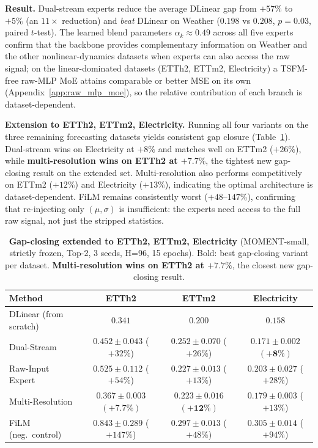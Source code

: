 \documentclass{article}
\begin{document}
\textbf{Result.} Dual-stream experts reduce the average DLinear gap from $+57\%$ to $+5\%$ (an $11\times$ reduction) and \emph{beat} DLinear on Weather ($0.198$ vs $0.208$, $p{=}0.03$, paired $t$-test). The learned blend parameters $\alpha_k \approx 0.49$ across all five experts confirm that the backbone provides complementary information on Weather and the other nonlinear-dynamics datasets when experts can also access the raw signal; on the linear-dominated datasets (ETTh2, ETTm2, Electricity) a TSFM-free raw-MLP MoE attains comparable or better MSE on its own (Appendix~\ref{app:raw_mlp_moe}), so the relative contribution of each branch is dataset-dependent.

\textbf{Extension to ETTh2, ETTm2, Electricity.} Running all four variants on the three remaining forecasting datasets yields consistent gap closure (Table~\ref{tab:gap_closing_ext}). Dual-stream wins on Electricity at $+8\%$ and matches well on ETTm2 ($+26\%$), while \textbf{multi-resolution wins on ETTh2 at $+7.7\%$}, the tightest new gap-closing result on the extended set. Multi-resolution also performs competitively on ETTm2 ($+12\%$) and Electricity ($+13\%$), indicating the optimal architecture is dataset-dependent. FiLM remains consistently worst ($+48$--$147\%$), confirming that re-injecting only $(\mu,\sigma)$ is insufficient: the experts need access to the full raw signal, not just the stripped statistics.

\begin{table}[!htbp]
\centering
\caption{\textbf{Gap-closing extended to ETTh2, ETTm2, Electricity} (MOMENT-small, strictly frozen, Top-2, 3 seeds, H=96, 15 epochs). Bold: best gap-closing variant per dataset. \textbf{Multi-resolution wins on ETTh2 at $+7.7\%$}, the closest new gap-closing result.}
\label{tab:gap_closing_ext}
\small
\begin{tabular}{@{}lccc@{}}
\toprule
Method & ETTh2 & ETTm2 & Electricity \\
\midrule
DLinear (from scratch) & $\mathit{0.341}$ & $\mathit{0.200}$ & $\mathit{0.158}$ \\
\midrule
Dual-Stream & $0.452 \pm 0.043$ {\scriptsize($+32\%$)} & $0.252 \pm 0.070$ {\scriptsize($+26\%$)} & $\mathbf{0.171 \pm 0.002}$ {\scriptsize$\mathbf{(+8\%)}$} \\
Raw-Input Expert & $0.525 \pm 0.112$ {\scriptsize($+54\%$)} & $0.227 \pm 0.013$ {\scriptsize($+13\%$)} & $0.203 \pm 0.027$ {\scriptsize($+28\%$)} \\
Multi-Resolution & $\mathbf{0.367 \pm 0.003}$ {\scriptsize$\mathbf{(+7.7\%)}$} & $\mathbf{0.223 \pm 0.016}$ {\scriptsize$\mathbf{(+12\%)}$} & $0.179 \pm 0.003$ {\scriptsize($+13\%$)} \\
FiLM (neg.\ control) & $0.843 \pm 0.289$ {\scriptsize($+147\%$)} & $0.297 \pm 0.013$ {\scriptsize($+48\%$)} & $0.305 \pm 0.014$ {\scriptsize($+94\%$)} \\
\bottomrule
\end{tabular}
\end{table}
\end{document}
